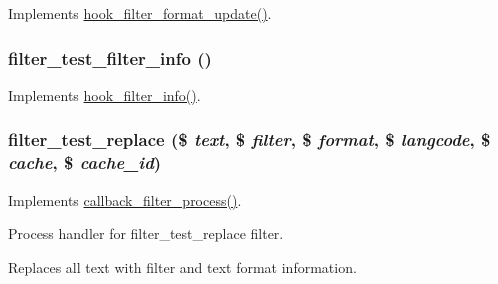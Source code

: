 Implements \hyperlink{group__hooks_gaf9e4490f3ca224c161481754a3332c92}{hook\_\-filter\_\-format\_\-update()}. \hypertarget{filter__test_8module_af4bc201de88d2e5678bfbb2cac1159bf}{
\subsubsection[{filter\_\-test\_\-filter\_\-info}]{\setlength{\rightskip}{0pt plus 5cm}filter\_\-test\_\-filter\_\-info ()}}
\label{filter__test_8module_af4bc201de88d2e5678bfbb2cac1159bf}
Implements \hyperlink{group__hooks_gaf2a2f2a46589420df896a0d42247f15a}{hook\_\-filter\_\-info()}. \hypertarget{filter__test_8module_af8dd6e82b961e96cd06133f1207014ea}{
\subsubsection[{filter\_\-test\_\-replace}]{\setlength{\rightskip}{0pt plus 5cm}filter\_\-test\_\-replace (\$ {\em text}, \/  \$ {\em filter}, \/  \$ {\em format}, \/  \$ {\em langcode}, \/  \$ {\em cache}, \/  \$ {\em cache\_\-id})}}
\label{filter__test_8module_af8dd6e82b961e96cd06133f1207014ea}
Implements \hyperlink{group__callbacks_ga5f82accd878d144a22ea2dfec253f91d}{callback\_\-filter\_\-process()}.

Process handler for filter\_\-test\_\-replace filter.

Replaces all text with filter and text format information. 